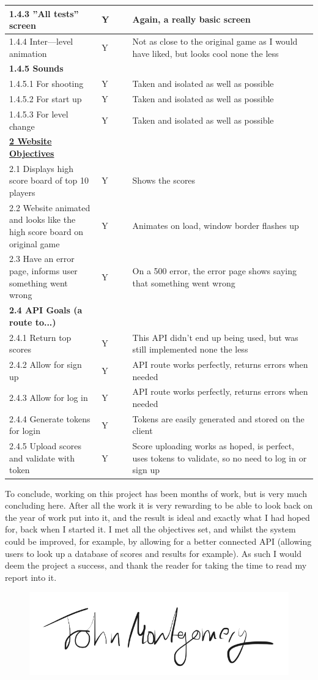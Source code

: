 \begin{longtable}{|p{0.3\linewidth}|p{0.1\linewidth}|p{0.6\linewidth}|}
1.4.3 ”All tests” screen & Y & Again, a really basic screen \\ \hline
1.4.4 Inter—level animation & Y & Not as close to the original game as I would have liked, but looks cool none the less \\ \hline
\textbf{1.4.5 Sounds} &  &  \\ \hline
1.4.5.1 For shooting & Y & Taken and isolated as well as possible \\ \hline
1.4.5.2 For start up & Y & Taken and isolated as well as possible \\ \hline
1.4.5.3 For level change & Y & Taken and isolated as well as possible \\ \hline
{\ul \textbf{2 Website Objectives}} &  &  \\ \hline
2.1 Displays high score board of top 10 players & Y & Shows the scores \\ \hline
2.2 Website animated and looks like the high score board on original game & Y & Animates on load, window border flashes up \\ \hline
2.3 Have an error page, informs user something went wrong & Y & On a 500 error, the error page shows saying that something went wrong \\ \hline
\textbf{2.4 API Goals (a route to...)} &  &  \\ \hline
2.4.1 Return top scores & Y & This API didn't end up being used, but was still implemented none the less \\ \hline
2.4.2 Allow for sign up & Y & API route works perfectly, returns errors when needed \\ \hline
2.4.3 Allow for log in & Y & API route works perfectly, returns errors when needed \\ \hline
2.4.4 Generate tokens for login & Y & Tokens are easily generated and stored on the client \\ \hline
2.4.5 Upload scores and validate with token & Y & Score uploading works as hoped, is perfect, uses tokens to validate, so no need to log in or sign up \\ \hline
\end{longtable}

To conclude, working on this project has been months of work, but is very much concluding here. After all the work it is very rewarding to be able to look back on the year of work put into it, and the result is ideal and exactly what I had hoped for, back when I started it. I met all the objectives set, and whilst the system could be improved, for example, by allowing for a better connected API (allowing users to look up a database of scores and results for example). As such I would deem the project a success, and thank the reader for taking the time to read my report into it.

\begin{figure}[H]
    
  \includegraphics[width=.4\textwidth,right]{Figures/sign.png}
  
\end{figure}